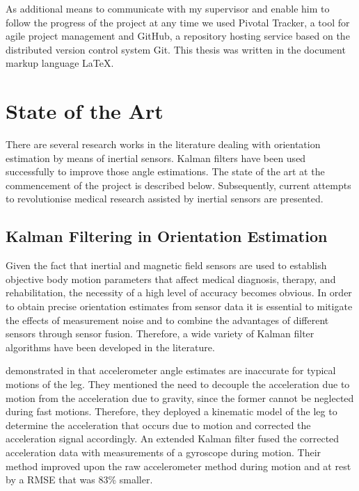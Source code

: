As additional means to communicate with my supervisor and enable him to follow the progress of the project at any time we used Pivotal Tracker, a tool for agile project management and GitHub, a repository hosting service based on the distributed version control system Git. This thesis was written in the document markup language \LaTeX{}.

\section{State of the Art}\label{sec:state_of_the_art}

There are several research works in the literature dealing with orientation estimation by means of inertial sensors. Kalman filters have been used successfully to improve those angle estimations. The state of the art at the commencement of the project is described below. Subsequently, current attempts to revolutionise medical research assisted by inertial sensors are presented.

\subsection{Kalman Filtering in Orientation Estimation}

Given the fact that inertial and magnetic field sensors are used to establish objective body motion parameters that affect medical diagnosis, therapy, and rehabilitation, the necessity of a high level of accuracy becomes obvious. In order to obtain precise orientation estimates from sensor data it is essential to mitigate the effects of measurement noise and to combine the advantages of different  sensors through sensor fusion. Therefore, a wide variety of Kalman filter algorithms have been developed in the literature.

\citeauthor{bennett_motion_2014} demonstrated in \cite{bennett_motion_2014} that accelerometer angle estimates are inaccurate for typical motions of the leg. They mentioned the need to decouple the acceleration due to motion from the acceleration due to gravity, since the former cannot be neglected during fast motions. Therefore, they deployed a kinematic model of the leg to determine the acceleration that occurs due to motion and corrected the acceleration signal accordingly. An extended Kalman filter fused the corrected acceleration data with measurements of a gyroscope during motion. Their method improved upon the raw accelerometer method during motion and at rest by a \gls{RMSE} that was 83\% smaller.

